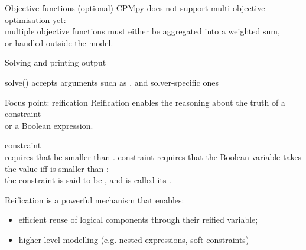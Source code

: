 \documentclass{cons-beamer}
\begin{document}
\begin{flashcardcpmpy}
\begin{frame}{Objective functions (optional)}
  \vspace{1em}
  CPMpy does not support multi-objective optimisation yet: \\ multiple
  objective functions must either be aggregated into a weighted sum, \\
  or handled outside the model.
\end{frame}

\begin{frame}{Solving and printing output}
 \begin{example}[Solving]
  \vspace{-0.5em}
  
  \vspace{-0.5em}
 \end{example}

  solve() accepts arguments such as ,  and solver-specific ones

  \begin{example}
    \vspace{-0.5em}
    
    \vspace{-0.5em}
  \end{example}
\end{frame}

\begin{frame}{Focus point: reification}
  Reification enables the reasoning about the truth of a constraint \\
  or a Boolean expression. \vfill
  \begin{example}
    constraint \\    
    requires that  be smaller than . \vfill
    constraint 
    requires that the Boolean variable  takes the value
     iff  is smaller than :\\
    the constraint  is said to be ,
    and  is called its .
  \end{example}\vfill

  Reification is a powerful mechanism that enables: \vfill
  \begin{itemize}
    \item efficient reuse of logical components through their reified variable; \vfill
    \item higher-level modelling (e.g. nested expressions, soft constraints)
  \end{itemize}
\end{frame}


\end{flashcardcpmpy}
\end{document}
